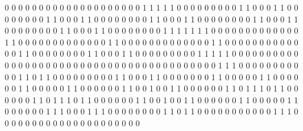 0 0 0 0 0 0 0 0 0 0 0 0 0 0 0
0 0 0 0 0 1 1 1 1 1 0 0 0 0 0
0 0 0 0 1 1 0 0 0 1 1 0 0 0 0
0 0 0 0 1 1 0 0 0 1 1 0 0 0 0
0 0 0 0 1 1 0 0 0 1 1 0 0 0 0
0 0 0 0 1 1 0 0 0 1 1 0 0 0 0
0 0 0 0 1 1 0 0 0 1 1 0 0 0 0
0 0 0 0 1 1 1 1 1 1 1 0 0 0 0
0 0 0 0 0 0 0 0 0 1 1 0 0 0 0
0 0 0 0 0 0 0 0 0 1 1 0 0 0 0
0 0 0 0 0 0 0 0 0 1 1 0 0 0 0
0 0 0 0 0 0 0 0 0 1 1 0 0 0 0
0 0 0 0 1 1 0 0 0 1 1 0 0 0 0
0 0 0 0 0 1 1 1 1 1 0 0 0 0 0
0 0 0 0 0 0 0 0 0 0 0 0 0 0 0
0 0 0 0 0 0 0 0 0 0 0 0 0 0 0
0 0 0 0 0 0 1 1 1 0 0 0 0 0 0
0 0 0 0 0 1 1 0 1 1 0 0 0 0 0
0 0 0 0 1 1 0 0 0 1 1 0 0 0 0
0 0 0 1 1 0 0 0 0 0 1 1 0 0 0
0 0 0 1 1 0 0 0 0 0 1 1 0 0 0
0 0 0 1 1 0 0 1 0 0 1 1 0 0 0
0 0 0 1 1 0 1 1 1 0 1 1 0 0 0
0 0 0 1 1 0 1 1 1 0 1 1 0 0 0
0 0 0 1 1 0 0 1 0 0 1 1 0 0 0
0 0 0 1 1 0 0 0 0 0 1 1 0 0 0
0 0 0 1 1 1 0 0 0 1 1 1 0 0 0
0 0 0 0 0 1 1 0 1 1 0 0 0 0 0
0 0 0 0 0 0 1 1 1 0 0 0 0 0 0
0 0 0 0 0 0 0 0 0 0 0 0 0 0 0
